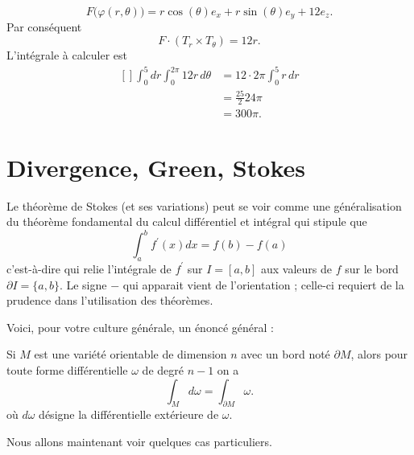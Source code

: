 \begin{example}
\begin{equation}
		F\big( \varphi(r,\theta) \big)=r\cos(\theta)e_x+r\sin(\theta)e_y+12e_z.
	\end{equation}
	Par conséquent
	\begin{equation}
		F\cdot(T_r\times T_{\theta})=12r.
	\end{equation}
	L'intégrale à calculer est
	\begin{equation}
		\begin{aligned}[]
			\int_0^5dr\int_0^{2\pi}12r\,d\theta & =12\cdot 2\pi\int_0^5r\,dr \\
			                                    & =\frac{ 25 }{ 2 }24\pi     \\
			                                    & =300\pi.
		\end{aligned}
	\end{equation}

\end{example}

\section{Divergence, Green, Stokes}

Le théorème de Stokes (et ses variations) peut se voir comme une généralisation du théorème fondamental du calcul différentiel et intégral qui stipule que
\begin{equation*}
	\int_a^b f^\prime(x) d x = f(b) - f(a)
\end{equation*}
c'est-à-dire qui relie l'intégrale de \( f^\prime\) sur \( I = [a,b]\) aux valeurs de \( f\) sur le bord \( \partial I = \{a,b\}\). Le signe \( -\) qui apparait vient de l'orientation ; celle-ci requiert de la prudence dans l'utilisation des théorèmes.

Voici, pour votre culture générale, un énoncé général :
\begin{theorem} \label{ThoATsPuzF}
	Si \( M\) est une variété orientable de dimension \( n\) avec un bord noté \( \partial  M\), alors pour toute forme différentielle \( \omega\) de degré \( n-1\) on a
	\begin{equation*}
		\int_{ M} d \omega = \int_{\partial  M} \omega.
	\end{equation*}
	où \( d \omega\) désigne la différentielle extérieure de \( \omega\).
\end{theorem}
Nous allons maintenant voir quelques cas particuliers.

